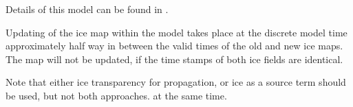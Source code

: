 \noindent
Details of this model can be found in \cite{tol:OMOD03a}.

Updating of the ice map within the model takes place at the discrete model
time approximately half way in between the valid times of the old and new ice
maps. The map will not be updated, if the time stamps of both ice fields are
identical.

Note that either ice transparency for propagation, or ice as a source term
should be used, but not both approaches. at the same time.
